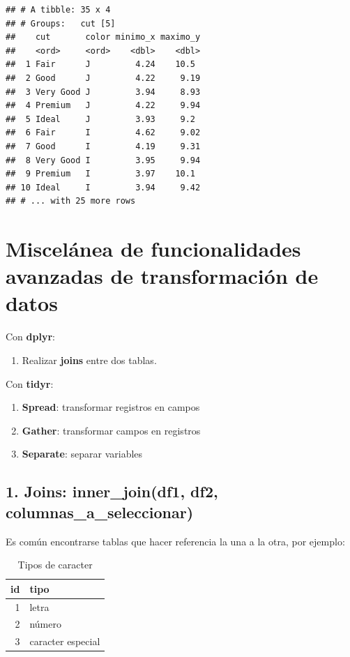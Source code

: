 \documentclass[]{book}
\providecommand{\tightlist}{%
  \setlength{\itemsep}{0pt}\setlength{\parskip}{0pt}}
\theoremstyle{definition}
\theoremstyle{definition}
\theoremstyle{definition}
\theoremstyle{remark}
\begin{document}
\begin{verbatim}
## # A tibble: 35 x 4
## # Groups:   cut [5]
##    cut       color minimo_x maximo_y
##    <ord>     <ord>    <dbl>    <dbl>
##  1 Fair      J         4.24    10.5 
##  2 Good      J         4.22     9.19
##  3 Very Good J         3.94     8.93
##  4 Premium   J         4.22     9.94
##  5 Ideal     J         3.93     9.2 
##  6 Fair      I         4.62     9.02
##  7 Good      I         4.19     9.31
##  8 Very Good I         3.95     9.94
##  9 Premium   I         3.97    10.1 
## 10 Ideal     I         3.94     9.42
## # ... with 25 more rows
\end{verbatim}

\section{Miscelánea de funcionalidades avanzadas de transformación de
datos}\label{miscelanea-de-funcionalidades-avanzadas-de-transformacion-de-datos}

Con \textbf{dplyr}:

\begin{enumerate}
\def\labelenumi{\arabic{enumi}.}
\tightlist
\item
  Realizar \textbf{joins} entre dos tablas.
\end{enumerate}

Con \textbf{tidyr}:

\begin{enumerate}
\def\labelenumi{\arabic{enumi}.}
\setcounter{enumi}{1}
\tightlist
\item
  \textbf{Spread}: transformar registros en campos
\item
  \textbf{Gather}: transformar campos en registros
\item
  \textbf{Separate}: separar variables
\end{enumerate}

\subsection{1. Joins: inner\_join(df1, df2,
columnas\_a\_seleccionar)}\label{joins-inner_joindf1-df2-columnas_a_seleccionar}

Es común encontrarse tablas que hacer referencia la una a la otra, por
ejemplo:

\begin{table}

\caption{\label{tab:unnamed-chunk-29}Tipos de caracter}
\centering
\begin{tabular}[t]{r|l}
\hline
id & tipo\\
\hline
1 & letra\\
\hline
2 & número\\
\hline
3 & caracter especial\\
\hline
\end{tabular}
\end{table}
\end{document}
